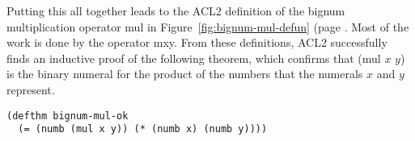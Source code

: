 Putting this all together leads to the ACL2 definition
of the bignum multiplication operator \textsf{mul} in
Figure~\ref{fig:bignum-mul-defun} (page \pageref{fig:bignum-mul-defun}.
Most of the work is done by the operator \textsf{mxy}.
From these definitions, ACL2 successfully finds an
inductive proof of the following theorem,
which confirms that \textsf{(mul $x$ $y$)} is the binary numeral
for the product of the numbers that the numerals $x$ and $y$ represent.

\label{bignum-mul-thm}
\begin{code}
\begin{verbatim}
(defthm bignum-mul-ok
  (= (numb (mul x y)) (* (numb x) (numb y))))
\end{verbatim}
\end{code}

\begin{exercises}
\end{exercises}


